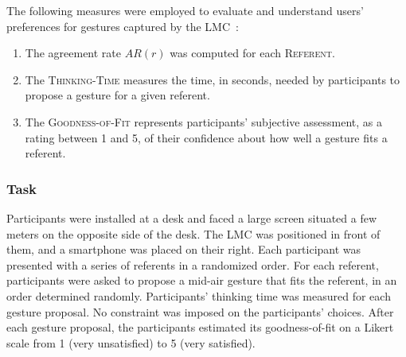 The following measures were employed to evaluate and understand users' preferences for gestures captured by the LMC~\cite{Gheran:2018}:
\begin{enumerate}[noitemsep]
    \item The agreement rate $AR(r)$ was computed for each \textsc{Referent}.%

    \item The \textsc{Thinking-Time} measures the time, in seconds, needed by participants to propose a gesture for a given referent.
    
    \item The \textsc{Goodness-of-Fit} represents participants' subjective assessment, as a rating between 1 and 5, of their confidence about how well a gesture fits a referent.
\end{enumerate}

    

\subsubsection{Task}
Participants were installed at a desk and faced a large screen situated a few meters on the opposite side of the desk. The LMC was positioned in front of them, and a smartphone was placed on their right. Each participant was presented with a series of referents in a randomized order. For each referent, participants were asked to propose a mid-air gesture that fits the referent, in an order determined randomly. Participants' thinking time was measured for each gesture proposal. No constraint was imposed on the participants' choices. After each gesture proposal, the participants estimated its goodness-of-fit on a Likert scale from 1 (very unsatisfied) to 5 (very satisfied).


